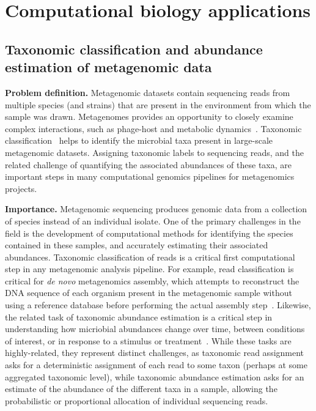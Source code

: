 
\section{Computational biology applications}


\subsection{Taxonomic classification and abundance estimation of metagenomic data}

\textbf{Problem definition.}
Metagenomic datasets contain sequencing reads from multiple species (and strains) that are present in the environment from which the sample was drawn. Metagenomes provides an opportunity to closely examine complex  interactions, such as phage-host and metabolic dynamics~\cite{national2007new}.
%
Taxonomic classification~\cite{wood2014kraken} helps to identify the microbial taxa present in large-scale  metagenomic datasets. Assigning taxonomic labels to sequencing reads, and the related challenge of quantifying the associated abundances of these taxa, are important steps in many computational genomics pipelines for metagenomics projects.

\noindent
\textbf{Importance.}
Metagenomic sequencing produces genomic data from a collection of species instead of an individual isolate. One of the primary challenges in the field is the development of computational methods for identifying the species contained in these samples, and accurately estimating their associated abundances.
%
Taxonomic classification of reads is a critical first computational step in any metagenomic analysis pipeline. For example, read classification is critical for \emph{de novo} metagenomics assembly, which attempts to reconstruct the DNA sequence of each organism present in the metagenomic sample without using a reference database before performing the actual assembly step~\cite{venter2004environmental,brady2009phymm,brady2011phymmbl,rosen2008metagenome,segata2012metagenomic}.  Likewise, the related task of taxonomic abundance estimation is a critical step in understanding how micriobial abundances change over time, between conditions of interest, or in response to a stimulus or treatment~\cite{Kaehler2019,wei2022kmcp,skoufos2022agamemnon,BlancoMguez2023}. While these tasks are highly-related, they represent distinct challenges, as taxonomic read assignment asks for a deterministic assignment of each read to some taxon (perhaps at some aggregated taxonomic level), while taxonomic abundance estimation asks for an estimate of the abundance of the different taxa in a sample, allowing the probabilistic or proportional allocation of individual sequencing reads.

